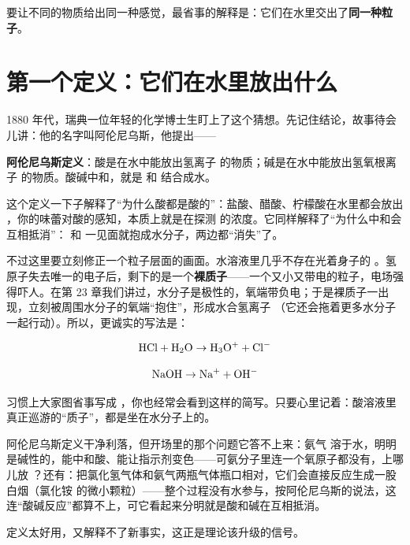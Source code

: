 要让不同的物质给出同一种感觉，最省事的解释是：它们在水里交出了\textbf{同一种粒子}。

\section{第一个定义：它们在水里放出什么}

1880 年代，瑞典一位年轻的化学博士生盯上了这个猜想。先记住结论，故事待会儿讲：他的名字叫阿伦尼乌斯，他提出——

\begin{qiaoliang}
\textbf{阿伦尼乌斯定义}：酸是在水中能放出氢离子  的物质；碱是在水中能放出氢氧根离子  的物质。酸碱中和，就是  和  结合成水。
\end{qiaoliang}

这个定义一下子解释了“为什么酸都是酸的”：盐酸、醋酸、柠檬酸在水里都会放出 ，你的味蕾对酸的感知，本质上就是在探测  的浓度。它同样解释了“为什么中和会互相抵消”： 和  一见面就抱成水分子，两边都“消失”了。

不过这里要立刻修正一个粒子层面的画面。水溶液里几乎不存在光着身子的 。氢原子失去唯一的电子后，剩下的是一个\textbf{裸质子}——一个又小又带电的粒子，电场强得吓人。在第 23 章我们讲过，水分子是极性的，氧端带负电；于是裸质子一出现，立刻被周围水分子的氧端“抱住”，形成水合氢离子 （它还会拖着更多水分子一起行动）。所以，更诚实的写法是：

\[\mathrm{HCl} + \mathrm{H_2O} \rightarrow \mathrm{H_3O^+} + \mathrm{Cl^-}\]

\[\mathrm{NaOH} \rightarrow \mathrm{Na^+} + \mathrm{OH^-}\]

习惯上大家图省事写成 ，你也经常会看到这样的简写。只要心里记着：酸溶液里真正巡游的“质子”，都是坐在水分子上的。

阿伦尼乌斯定义干净利落，但开场里的那个问题它答不上来：氨气  溶于水，明明是碱性的，能中和酸、能让指示剂变色——可氨分子里连一个氧原子都没有，上哪儿放 ？还有：把氯化氢气体和氨气两瓶气体瓶口相对，它们会直接反应生成一股白烟（氯化铵  的微小颗粒）——整个过程没有水参与，按阿伦尼乌斯的说法，这连“酸碱反应”都算不上，可它看起来分明就是酸和碱在互相抵消。

定义太好用，又解释不了新事实，这正是理论该升级的信号。

